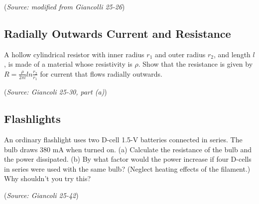 \documentclass{article}
\begin{document}
(\textit{Source: modified from Giancolli 25-26})

\subsection{Radially Outwards Current and Resistance}

A hollow cylindrical resistor with inner radius $r_1$ and outer radius $r_2$, and length $l$, is made of a material whose resistivity is $\rho$. Show that the resistance is given by $R=\frac{\rho}{2\pi l}ln\frac{r_2}{r_1}$ for current that flows radially outwards.

(\textit{Source: Giancoli 25-30, part (a)})

\subsection{Flashlights}

An ordinary flashlight uses two D-cell 1.5-V batteries connected in series. The bulb draws 380 mA when turned on. (a) Calculate the resistance of the bulb and the power dissipated. (b) By what factor would the power increase if four D-cells in series were used with the same bulb? (Neglect heating effects of the filament.) Why shouldn't you try this?

(\textit{Source: Giancoli 25-42})
\end{document}
